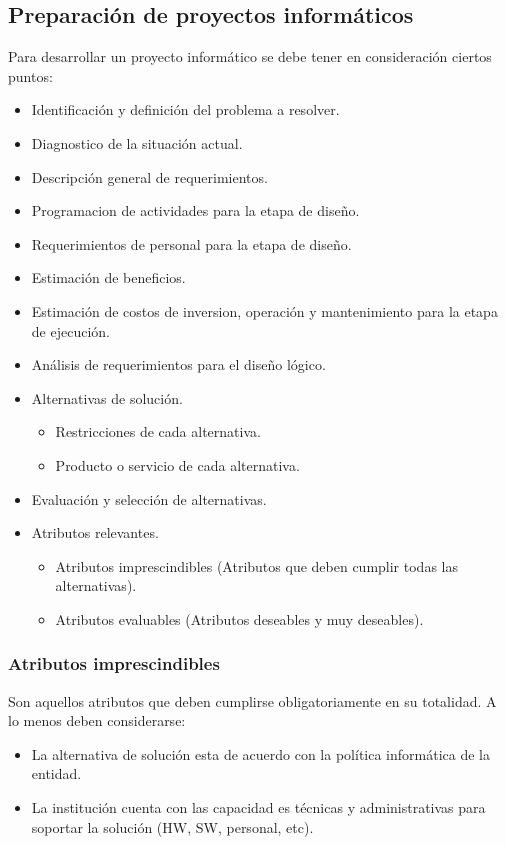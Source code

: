 \documentclass{templateNote}
\begin{document}
\subsection*{Preparación de proyectos informáticos}
Para desarrollar un proyecto informático se debe tener en consideración ciertos puntos:

\begin{itemize}
    \item Identificación y definición del problema a resolver.
    \item Diagnostico de la situación actual.
    \item Descripción general de requerimientos.
    \item Programacion de actividades para la etapa de diseño.
    \item Requerimientos de personal para la etapa de diseño.
    \item Estimación de beneficios.
    \item Estimación de costos de inversion, operación y mantenimiento para la etapa de ejecución.
    \item Análisis de requerimientos para el diseño lógico.
    \item Alternativas de solución.
    \begin{itemize}
        \item Restricciones de cada alternativa.
        \item Producto o servicio de cada alternativa.
    \end{itemize}
    \item Evaluación y selección de alternativas.
    \item Atributos relevantes.
    \begin{itemize}
        \item Atributos imprescindibles (Atributos que deben cumplir todas las alternativas).
        \item Atributos evaluables (Atributos deseables y muy deseables).
    \end{itemize}
\end{itemize}

\subsubsection*{Atributos imprescindibles}
Son aquellos atributos que deben cumplirse obligatoriamente en su totalidad. A lo menos deben considerarse:
\begin{itemize}
    \item La alternativa de solución esta de acuerdo con la política informática de la entidad.
    \item La institución cuenta con las capacidad es técnicas y administrativas para soportar la solución (HW, SW, personal, etc).
\end{itemize}
\end{document}
